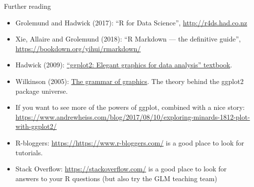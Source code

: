 \documentclass[
  ignorenonframetext,
]{beamer}
\begin{document}
\begin{frame}{Further reading}
\label{further-reading}
\begin{itemize}
\item
  Grolemund and Hadwick (2017): ``R for Data Science'',
  \url{http://r4ds.had.co.nz}
\item
  Xie, Allaire and Grolemund (2018): ``R Markdown --- the definitive
  guide'', \url{https://bookdown.org/yihui/rmarkdown/}
\item
  Hadwick (2009):
  \href{https://link.springer.com/book/10.1007\%2F978-0-387-98141-3}{``ggplot2:
  Elegant graphics for data analysis'' textbook}.
\item
  Wilkinson (2005):
  \href{https://www.springer.com/gp/book/9780387245447}{The grammar of
  graphics}. The theory behind the ggplot2 package universe.
\item
  If you want to see more of the powers of ggplot, combined with a nice
  story:
  \url{https://www.andrewheiss.com/blog/2017/08/10/exploring-minards-1812-plot-with-ggplot2/}
\item
  R-bloggers: \url{https://https://www.r-bloggers.com/} is a good place
  to look for tutorials.
\item
  Stack Overflow: \url{https://stackoverflow.com/} is a good place to
  look for answers to your R questions (but also try the GLM teaching
  team)
\end{itemize}
\end{frame}
\end{document}
